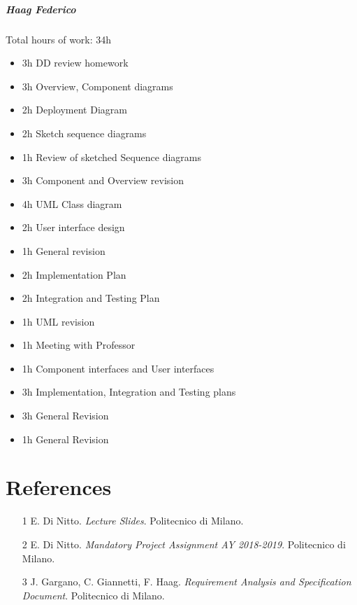 \documentclass{report}
\newcommand{\ic}[1]{\textit{#1}}
\begin{document}
		\paragraph{Haag Federico} Total hours of work: 34h
			\begin{itemize}
				\item 3h DD review homework
				\item 3h Overview, Component diagrams
				\item 2h Deployment Diagram
				\item 2h Sketch sequence diagrams
				\item 1h Review of sketched Sequence diagrams
				\item 3h Component and Overview revision
				\item 4h UML Class diagram
				\item 2h User interface design
				\item 1h General revision
				\item 2h Implementation Plan
				\item 2h Integration and Testing Plan
				\item 1h UML revision
				\item 1h Meeting with Professor
				\item 1h Component interfaces and User interfaces
				\item 3h Implementation, Integration and Testing plans
				\item 3h General Revision
				\item 1h General Revision
			\end{itemize}
			
	\chapter{References}
	\thispagestyle{fancy}
	\begin{itemize}
		\item [1]\label{ref:1} E. Di Nitto. \ic{Lecture Slides}. Politecnico di Milano.
		\item [2]\label{ref:2} E. Di Nitto. \ic{Mandatory Project Assignment AY 2018-2019}. Politecnico di Milano.
		\item [3]\label{ref:3} J. Gargano, C. Giannetti, F. Haag. \ic{Requirement Analysis and Specification Document}. Politecnico di Milano.
	\end{itemize}
	
\end{document}
